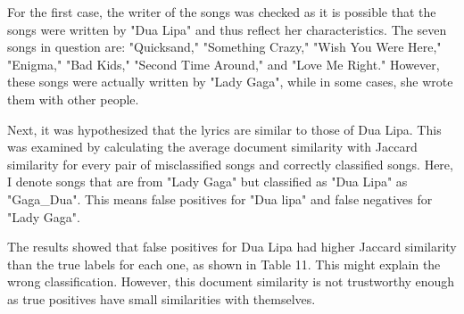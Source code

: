\documentclass[a4paper,11pt]{article}
\begin{document}

For the first case, the writer of the songs was checked as it is possible that the songs were written by "Dua Lipa" and thus reflect her characteristics.
The seven songs in question are: "Quicksand," "Something Crazy," "Wish You Were Here," "Enigma," "Bad Kids," "Second Time Around," and "Love Me Right."
However, these songs were actually written by "Lady Gaga", while in some cases, she wrote them with other people.



Next, it was hypothesized that the lyrics are similar to those of Dua Lipa.
This was examined by calculating the average document similarity with Jaccard similarity for every pair of misclassified songs and correctly classified songs.
Here, I denote songs that are from "Lady Gaga" but classified as "Dua Lipa" as "Gaga\_Dua".
This means false positives for "Dua lipa" and false negatives for "Lady Gaga".


The results showed that false positives for Dua Lipa had higher Jaccard similarity than the true labels for each one, as shown in Table 11.
This might explain the wrong classification.
However, this document similarity is not trustworthy enough as true positives have small similarities with themselves.
\end{document}
